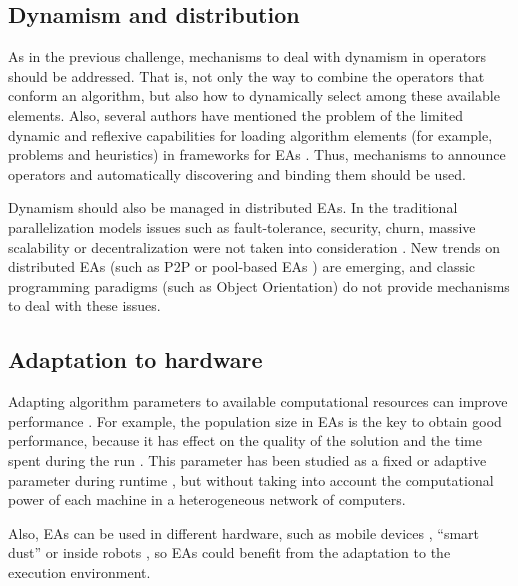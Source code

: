 \subsection{Dynamism and distribution}
As in the previous challenge, mechanisms to deal with dynamism in operators should be addressed. That is, not only the way to combine the operators that conform an algorithm, but also how to dynamically select among these available elements. Also, several authors have mentioned the problem of the limited dynamic and reflexive capabilities for loading algorithm elements (for example, problems and heuristics) in frameworks for EAs \cite{SURVEYMOFS}. Thus, mechanisms to announce operators and automatically discovering and binding them should be used.

Dynamism should also be managed in distributed EAs. In the traditional parallelization models \cite{alba2002parallelism} issues such as fault-tolerance, security, churn, massive scalability or decentralization were not taken into consideration \cite{Alba13parallel}. New trends on distributed EAs (such as P2P \cite{laredo2010evag} or pool-based EAs \cite{merelo2012pool}) are emerging,  and classic programming paradigms (such as Object Orientation) do not provide mechanisms to deal with these issues.

\subsection{Adaptation to hardware}
Adapting algorithm parameters to available computational resources can improve performance \cite{AutomaticallyConfiguringStyles12}.  For example, the population size in EAs is the key to obtain good performance, because it has effect on the quality of the solution and the time spent during the run \cite{ShrinkageLaredo09}. This parameter has been studied as a fixed \cite{SizingHarik99} or adaptive parameter during runtime \cite{AdaptiveLobo07,SelfRegulatedSizeFernandes06}, but without taking into account the computational power of each machine in a heterogeneous network of computers. 

Also, EAs can be used in different hardware, such as mobile devices \cite{Garcia2009Mobile}, ``smart dust'' \cite{Rollings2008smartdust} or inside robots \cite{Garcia2012testing}, so EAs could benefit from the adaptation to the execution environment.


